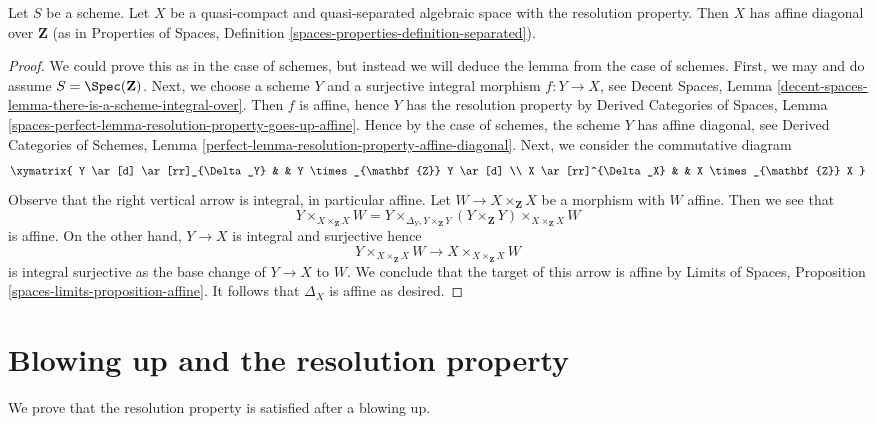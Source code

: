 \begin{lemma}
\label{lemma-resolution-property-affine-diagonal}
Let $S$ be a scheme.
Let $X$ be a quasi-compact and quasi-separated algebraic space with
the resolution property. Then $X$ has affine diagonal over $\mathbf{Z}$
(as in Properties of Spaces, Definition
\ref{spaces-properties-definition-separated}).
\end{lemma}

\begin{proof}
We could prove this as in the case of schemes, but instead we will
deduce the lemma from the case of schemes.
First, we may and do assume $S = \Spec(\mathbf{Z})$.
Next, we choose a scheme $Y$ and a surjective integral morphism
$f : Y \to X$, see
Decent Spaces, Lemma \ref{decent-spaces-lemma-there-is-a-scheme-integral-over}.
Then $f$ is affine, hence $Y$ has the resolution property by
Derived Categories of Spaces, Lemma
\ref{spaces-perfect-lemma-resolution-property-goes-up-affine}.
Hence by the case of schemes, the scheme $Y$ has affine diagonal, see
Derived Categories of Schemes, Lemma
\ref{perfect-lemma-resolution-property-affine-diagonal}.
Next, we consider the commutative diagram
$$
\xymatrix{
Y \ar[d] \ar[rr]_{\Delta_Y} & & Y \times_{\mathbf{Z}} Y \ar[d] \\
X \ar[rr]^{\Delta_X} & & X \times_{\mathbf{Z}} X
}
$$
Observe that the right vertical arrow is integral, in particular
affine. Let $W \to X \times_{\mathbf{Z}} X$ be a morphism with $W$ affine.
Then we see that
$$
Y \times_{X \times_{\mathbf{Z}} X} W =
Y \times_{\Delta_Y, Y \times_{\mathbf{Z}} Y}
(Y \times_{\mathbf{Z}} Y) \times_{X \times_{\mathbf{Z}} X} W
$$
is affine. On the other hand, $Y \to X$ is integral and surjective
hence
$$
Y \times_{X \times_{\mathbf{Z}} X} W
\longrightarrow
X \times_{X \times_{\mathbf{Z}} X} W
$$
is integral surjective as the base change of $Y \to X$ to $W$.
We conclude that the target of this arrow is affine by
Limits of Spaces, Proposition \ref{spaces-limits-proposition-affine}.
It follows that $\Delta_X$ is affine as desired.
\end{proof}







\section{Blowing up and the resolution property}
\label{section-resolution-property-by-blowing-up}

\noindent
We prove that the resolution property is satisfied after a blowing up.

